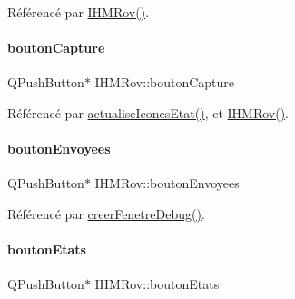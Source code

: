 Référencé par \hyperlink{class_i_h_m_rov_a5dac1fb4612866cc61f699a415e0ef6b}{I\+H\+M\+Rov()}.

\mbox{\label{class_i_h_m_rov_a149c634582225cff29b6c8555eb7ba85}} 
\paragraph{\texorpdfstring{bouton\+Capture}{boutonCapture}}
{\footnotesize\ttfamily Q\+Push\+Button$\ast$ I\+H\+M\+Rov\+::bouton\+Capture\hspace{0.3cm}{\ttfamily [private]}}



Référencé par \hyperlink{class_i_h_m_rov_abbfcdc154a6ae7f941d186f6c90a5a2b}{actualise\+Icones\+Etat()}, et \hyperlink{class_i_h_m_rov_a5dac1fb4612866cc61f699a415e0ef6b}{I\+H\+M\+Rov()}.

\mbox{\label{class_i_h_m_rov_a7a441ed53b0066edaf1f0acbea24e777}} 
\paragraph{\texorpdfstring{bouton\+Envoyees}{boutonEnvoyees}}
{\footnotesize\ttfamily Q\+Push\+Button$\ast$ I\+H\+M\+Rov\+::bouton\+Envoyees\hspace{0.3cm}{\ttfamily [private]}}



Référencé par \hyperlink{class_i_h_m_rov_a30b49bada719a73e0899ad4bafb4de99}{creer\+Fenetre\+Debug()}.

\mbox{\label{class_i_h_m_rov_a82f0ceba3dadd7a3d3251c236bf212a4}} 
\paragraph{\texorpdfstring{bouton\+Etats}{boutonEtats}}
{\footnotesize\ttfamily Q\+Push\+Button$\ast$ I\+H\+M\+Rov\+::bouton\+Etats\hspace{0.3cm}{\ttfamily [private]}}



